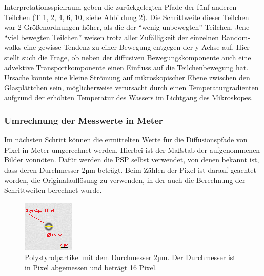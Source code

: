 \documentclass[
  9pt,
]{article}
\begin{document}
Interpretationsspielraum geben die zurückgelegten Pfade der fünf anderen
Teilchen (T 1, 2, 4, 6, 10, siehe Abbildung 2). Die Schrittweite dieser
Teilchen war 2 Größenordnungen höher, als die der ``wenig unbewegten''
Teilchen. Jene ``viel bewegten Teilchen'' weisen trotz aller
Zufälligkeit der einzelnen Random-walks eine gewisse Tendenz zu einer
Bewegung entgegen der y-Achse auf. Hier stellt such die Frage, ob neben
der diffusiven Bewegungskomponente auch eine advektive
Transportkomponente einen Einfluss auf die Teilchenbewegung hat. Ursache
könnte eine kleine Strömung auf mikroskopischer Ebene zwischen den
Glasplättchen sein, möglicherweise verursacht durch einen
Temperaturgradienten aufgrund der erhöhten Temperatur des Wassers im
Lichtgang des Mikroskopes.

\hypertarget{umrechnung-der-messwerte-in-meter}{%
\subsubsection{Umrechnung der Messwerte in
Meter}\label{umrechnung-der-messwerte-in-meter}}

Im nächsten Schritt können die ermittelten Werte für die Diffusionspfade
von Pixel in Meter umgerechnet werden. Hierbei ist der Maßstab der
aufgenommenen Bilder vonnöten. Dafür werden die PSP selbst verwendet,
von denen bekannt ist, dass deren Durchmesser 2µm beträgt. Beim Zählen
der Pixel ist darauf geachtet worden, die Originalauflösung zu
verwenden, in der auch die Berechnung der Schrittweiten berechnet wurde.

\begin{figure}
\centering
\includegraphics[width=\textwidth,height=0.21\textheight]{Bilder/styrolpartikel.png}
\caption{Polystyrolpartikel mit dem Durchmesser 2µm. Der Durchmesser ist
in Pixel abgemessen und beträgt 16 Pixel.}
\end{figure}
\end{document}
